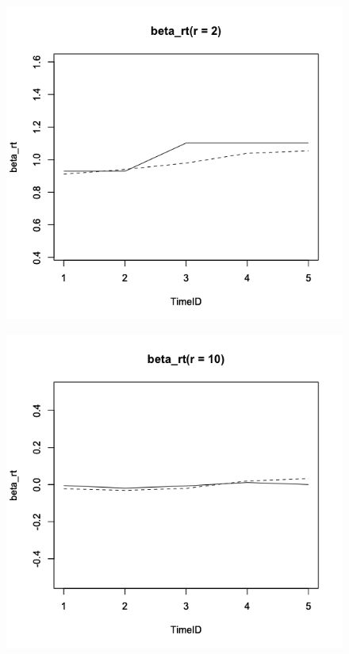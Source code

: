 \documentclass[a4paper,11pt,oneside,openany]{jsbook}
\begin{document}
\begin{figure}[]
 \begin{minipage}[b]{0.3\linewidth}
  \centering
  \includegraphics[keepaspectratio,scale=0.25]{img/beta_rt_param1.png}
  \label{1}
 \end{minipage}
 \begin{minipage}[b]{0.3\linewidth}
  \centering
  \includegraphics[keepaspectratio,scale=0.25]{img/beta_rt_param2.png}

\end{minipage}
\end{figure}
\end{document}
